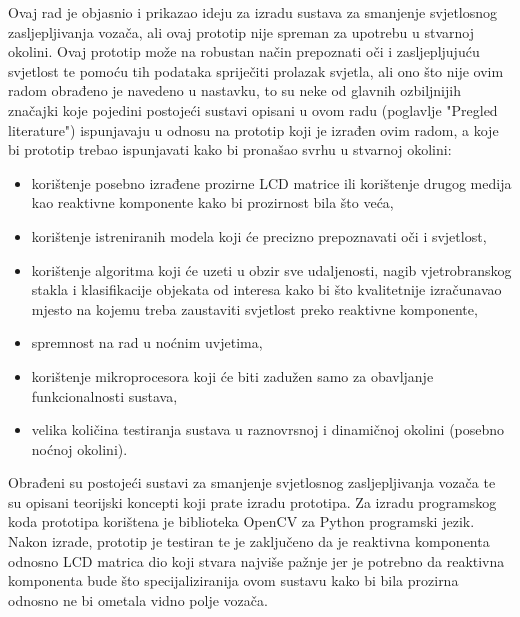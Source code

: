 \documentclass{foi}
\begin{document}
Ovaj rad je objasnio i prikazao ideju za izradu sustava za smanjenje svjetlosnog zasljepljivanja vozača, ali ovaj prototip nije spreman za upotrebu u stvarnoj okolini. Ovaj prototip može na robustan način prepoznati oči i zasljepljujuću svjetlost te pomoću tih podataka spriječiti prolazak svjetla, ali ono što nije ovim radom obrađeno je navedeno u nastavku, to su neke od glavnih ozbiljnijih značajki koje pojedini postojeći sustavi opisani u ovom radu (poglavlje "Pregled literature") ispunjavaju u odnosu na prototip koji je izrađen ovim radom, a koje bi prototip trebao ispunjavati kako bi pronašao svrhu u stvarnoj okolini:
\begin{itemize}[noitemsep]
    \item korištenje posebno izrađene prozirne LCD matrice ili korištenje drugog medija kao reaktivne komponente kako bi prozirnost bila što veća,
    \item korištenje istreniranih modela koji će precizno prepoznavati oči i svjetlost,
    \item korištenje algoritma koji će uzeti u obzir sve udaljenosti, nagib vjetrobranskog stakla i klasifikacije objekata od interesa kako bi što kvalitetnije izračunavao mjesto na kojemu treba zaustaviti svjetlost preko reaktivne komponente,
    \item spremnost na rad u noćnim uvjetima,
    \item korištenje mikroprocesora koji će biti zadužen samo za obavljanje funkcionalnosti sustava,
    \item velika količina testiranja sustava u raznovrsnoj i dinamičnoj okolini (posebno noćnoj okolini).
\end{itemize}

Obrađeni su postojeći sustavi za smanjenje svjetlosnog zasljepljivanja vozača te su opisani teorijski koncepti koji prate izradu prototipa. Za izradu programskog koda prototipa korištena je biblioteka OpenCV za Python programski jezik. Nakon izrade, prototip je testiran te je zaključeno da je reaktivna komponenta odnosno LCD matrica dio koji stvara najviše pažnje jer je potrebno da reaktivna komponenta bude što specijaliziranija ovom sustavu kako bi bila prozirna odnosno ne bi ometala vidno polje vozača.

\printbibliography[title=Popis literature]

\listoffigures
{}

\lstlistoflistings
{}
\end{document}
